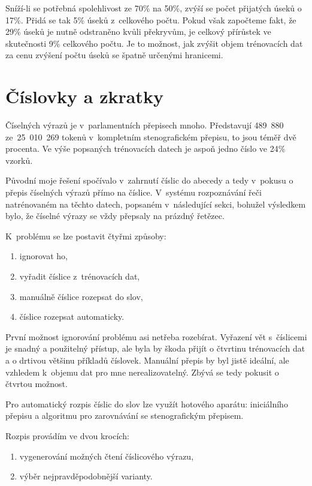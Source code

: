 Sníží-li se potřebná spolehlivost ze 70\% na 50\%, zvýší se počet přijatých úseků
o 17\%. Přidá se tak 5\% úseků z~celkového počtu. Pokud však započteme fakt, že
29\% úseků je nutně odstraněno kvůli překryvům, je celkový přírůstek ve
skutečnosti 9\% celkového počtu. Je to možnost, jak zvýšit objem trénovacích dat
za cenu zvýšení počtu úseků se špatně určenými hranicemi.

\section{Číslovky a zkratky}
\label{sec:svolocz:cislovky}

Číselných výrazů je v~parlamentních přepisech mnoho. Představují 489~880
ze~25~010~269 tokenů v~kompletním stenografickém přepisu, to jsou téměř dvě
procenta. Ve výše popsaných trénovacích datech je aspoň jedno číslo ve 24\%
vzorků.

Původní moje řešení spočívalo v~zahrnutí číslic do abecedy a tedy
v~pokusu o přepis číselných výrazů přímo na číslice. V~systému rozpoznávání řeči
natrénovaném na těchto datech, popsaném v~následující sekci, bohužel výsledkem bylo, že
číselné výrazy se vždy přepsaly na prázdný řetězec.

K~problému se lze postavit čtyřmi způsoby:
\begin{enumerate}
\item{ignorovat ho,}
\item{vyřadit číslice z~trénovacích dat,}
\item{manuálně číslice rozepsat do slov,}
\item{číslice rozepsat automaticky.}
\end{enumerate}

První možnost ignorování problému asi netřeba rozebírat.
Vyřazení vět s~číslicemi je snadný a použitelný přístup, ale byla by škoda
přijít o čtvrtinu trénovacích dat a o drtivou většinu příkladů číslovek.
Manuální přepis by byl jistě ideální, ale vzhledem k~objemu dat pro mne
nerealizovatelný. Zbývá se tedy pokusit o čtvrtou možnost.

Pro automatický rozpis číslic do slov lze využít hotového aparátu: iniciálního
přepisu a algoritmu pro zarovnávání se stenografickým přepisem.

Rozpis provádím ve dvou krocích:
\begin{enumerate}
\item{vygenerování možných čtení číslicového výrazu,}
\item{výběr nejpravděpodobnější varianty.}
\end{enumerate}

